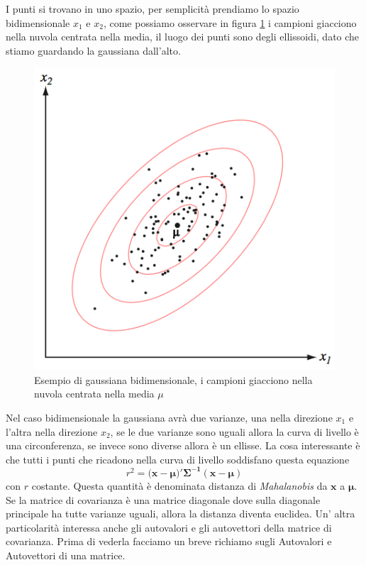 \noindent I punti si trovano in uno spazio, per semplicità prendiamo lo spazio bidimensionale $x_1$ e $x_2$, come possiamo osservare in figura \ref{gauss1} i campioni giacciono nella nuvola centrata nella media, il luogo dei punti sono degli ellissoidi, dato che stiamo guardando la gaussiana dall'alto.
\begin{figure}
\centering
\includegraphics[scale=0.5]{img/gauss1.png}
\caption{Esempio di gaussiana bidimensionale, i campioni giacciono nella nuvola centrata nella media $\mu$}
\label{gauss1}
\end{figure}
Nel caso bidimensionale la gaussiana avrà due varianze, una nella direzione $x_1$ e l'altra nella direzione $x_2$, se le due varianze sono uguali allora la curva di livello è una circonferenza, se invece sono diverse allora è un ellisse. La cosa interessante è che tutti i punti che ricadono nella curva di livello soddisfano questa equazione
\begin{equation}
r^2 = (\mathbf{x- \mu)' \Sigma^{-1} (x- \mu)}
\end{equation}
con $r$ costante. Questa quantità è denominata distanza di \emph{Mahalanobis} da $\mathbf{x}$ a $\mathbf{\mu}$. Se la matrice di covarianza è una matrice diagonale dove sulla diagonale principale ha tutte varianze uguali, allora la distanza diventa euclidea. Un' altra particolarità interessa anche gli autovalori e gli autovettori della matrice di covarianza. Prima di vederla facciamo un breve richiamo sugli Autovalori e Autovettori di una matrice.

